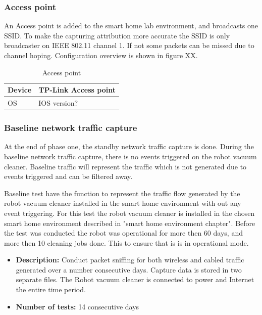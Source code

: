 \subsubsection{Access point}
An Access point is added to the smart home lab environment, and broadcasts one SSID. To make the capturing attribution more accurate the SSID is only broadcaster on IEEE 802.11 channel 1. If not some packets can be missed due to channel hoping. Configuration overview is shown in figure XX. 

\begin{table}[!hbtp]
\centering
\caption{Access point}
    \begin{tabular}{|l|l|}
    \hline
        Device & TP-Link Access point \\ \hline
        OS     & IOS version?         \\ \hline
    \end{tabular}
\end{table}

\subsubsection{Baseline network traffic capture}
At the end of phase one, the standby network traffic capture is done. During the baseline network traffic capture, there is no events triggered on the robot vacuum cleaner. Baseline traffic will represent the traffic which is not generated due to events triggered and can be filtered away. 

Baseline test have the function to represent the traffic flow generated by the robot vacuum cleaner installed in the smart home environment with out any event triggering. For this test the robot vacuum cleaner is installed in the chosen smart home environment described in "smart home environment chapter". Before the test was conducted the robot was operational for more then 60 days, and more then 10 cleaning jobs done. This to ensure that is is in operational mode.

\begin{itemize}
    \item \textbf{Description:} Conduct packet sniffing for both wireless and cabled traffic generated over a number consecutive days. Capture data is stored in two separate files. The Robot vacuum cleaner is connected to power and Internet the entire time period.
    \item \textbf{Number of tests:} 14 consecutive days
\end{itemize}

